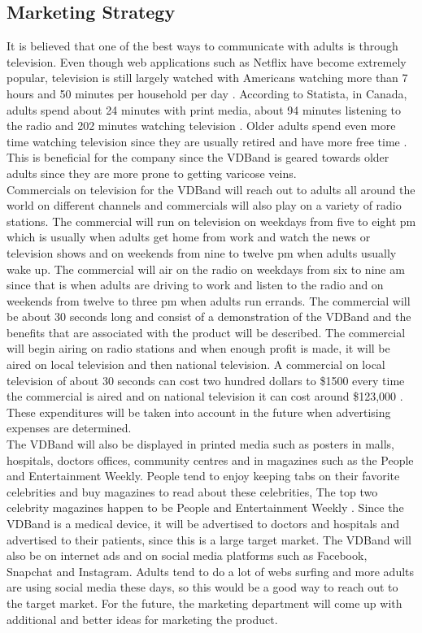 \documentclass[11.5pt]{article}
\begin{document}
\subsection{Marketing Strategy}
It is believed that one of the best ways to communicate with adults is through television. Even though web applications such as Netflix have become extremely popular, television is still largely watched with Americans watching more than 7 hours and 50 minutes per household per day \cite{ATL}. According to Statista, in Canada, adults spend about 24 minutes with print media, about 94 minutes listening to the radio and 202 minutes watching television \cite{Stats}. Older adults spend even more time watching television since they are usually retired and have more free time \cite{Stats}. This is beneficial for the company since the VDBand is geared towards older adults since they are more prone to getting varicose veins. \\

Commercials on television for the VDBand will reach out to adults all around the world on different channels and commercials will also play on a variety of radio stations. The commercial will run on television on weekdays from five to eight pm which is usually when adults get home from work and watch the news or television shows and on weekends from nine to twelve pm when adults usually wake up. The commercial will air on the radio on weekdays from six to nine am since that is when adults are driving to work and listen to the radio and on weekends from twelve to three pm when adults run errands. The commercial will be about 30 seconds long and consist of a demonstration of the VDBand and the benefits that are associated with the product will be described. The commercial will begin airing on radio stations and when enough profit is made, it will be aired on local television and then national television. A commercial on local television of about 30 seconds can cost two hundred dollars to \$1500 every time the commercial is aired and on national television it can cost around \$123,000 \cite{FSB}. These expenditures will be taken into account in the future when advertising expenses are determined. \\

The VDBand will also be displayed in printed media such as posters in malls, hospitals, doctors offices, community centres and in magazines such as the People and Entertainment Weekly. People tend to enjoy keeping tabs on their favorite celebrities and buy magazines to read about these celebrities, The top two celebrity magazines happen to be People and Entertainment Weekly \cite{AYCR}. Since the VDBand is a medical device, it will be advertised to doctors and hospitals and advertised to their patients, since this is a large target market. The VDBand will also be on internet ads and on social media platforms such as Facebook, Snapchat and Instagram. Adults tend to do a lot of webs surfing and more adults are using social media these days, so this would be a good way to reach out to the target market. For the future, the marketing department will come up with additional and better ideas for marketing the product.
\end{document}
